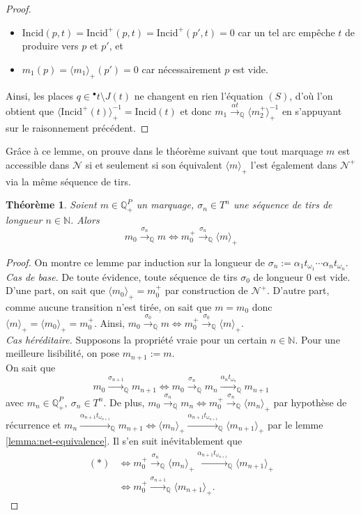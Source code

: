 \documentclass{article}
\newtheorem{theorem}{Théorème}
\theoremstyle{remark}
\theoremstyle{remark}
\newcommand{\preb}[1]{{}^\bullet #1}
\newcommand{\reaches}[1][]{\xrightarrow{#1}}
\newcommand{\creaches}[1][]{\reaches[#1]_{\mathbb{Q}}}
\newcommand{\induction}[3]{
    \textit{Cas de base.} #2\\
    \textit{Cas héréditaire.} Supposons la propriété vraie pour un certain $n \in #1$. #3
}
\newcommand{\extend}[1][\cdot]{\langle #1 \rangle}
\newcommand{\coextend}[1][\cdot]{\extend[#1]_+}
\newcommand{\rcoextend}[1][\cdot]{\coextend[#1]^{-1}}
\newcommand{\incid}{\mathrm{Incid}}
\begin{document}
\begin{proof}
\begin{itemize}
        \item $\incid(p, t) = \incid^+(p, t) = \incid^+(p', t) = 0$ car un tel arc empêche $t$ de produire vers $p$ et $p'$, et
        \item $m_1(p) = \coextend[m_1](p') = 0$ car nécessairement $p$ est vide.
    \end{itemize}
    
    Ainsi, les places $q \in \preb{t} \setminus J(t)$ ne changent en rien l'équation $(S)$, d'où l'on obtient que $\rcoextend[\incid^+(t)] = \incid(t)$ et donc $m_1 \creaches[\alpha t] \rcoextend[m_2^+]$ en s'appuyant sur le raisonnement précédent.
\end{proof}

Grâce à ce lemme, on prouve dans le théorème suivant que tout marquage $m$ est accessible dans $\mathcal{N}$ si et seulement si son équivalent $\coextend[m]$ l'est également dans $\mathcal{N}^+$ via la même séquence de tirs.

\begin{theorem}
    \label{theorem:inh-net-reset-net-equivalence}
    Soient $m \in \mathbb{Q}_+^P$ un marquage, $\sigma_n \in T^n$ une séquence de tirs de longueur $n \in \mathbb{N}$. Alors
    \[m_0 \creaches[\sigma_n] m \Longleftrightarrow m_0^+ \creaches[\sigma_n] \coextend[m]\]
\end{theorem}

\begin{proof}
    On montre ce lemme par induction sur la longueur de $\sigma_n := \alpha_1t_{\omega_1}\cdots\alpha_nt_{\omega_n}$.\\
    \induction{\mathbb{N}}{
        De toute évidence, toute séquence de tirs $\sigma_0$ de longueur $0$ est vide. D'une part, on sait que $\coextend[m_0] = m_0^+$ par construction de $\mathcal{N}^+$. D'autre part, comme aucune transition n'est tirée, on sait que $m = m_0$ donc $\coextend[m] = \coextend[m_0] = m_0^+$. Ainsi, $m_0 \creaches[\sigma_0] m \Longleftrightarrow m_0^+ \creaches[\sigma_0] \coextend[m]$.
    }{Pour une meilleure lisibilité, on pose $m_{n+1} := m$.\\
        On sait que \begin{equation}\tag{$*$}
            m_0 \creaches[\sigma_{n+1}] m_{n+1} \Longleftrightarrow m_0 \creaches[\sigma_n] m_n \creaches[\alpha_nt_{\omega_n}] m_{n+1}
        \end{equation}
        avec $m_n \in \mathbb{Q}_+^P,\ \sigma_n \in T^n$. De plus, $m_0 \creaches[\sigma_n] m_n \Longleftrightarrow m_0^+ \creaches[\sigma_n] \coextend[m_n]$ par hypothèse de récurrence et $m_n \creaches[\alpha_{n+1}t_{\omega_{n+1}}] m_{n+1} \Longleftrightarrow \coextend[m_n] \creaches[\alpha_{n+1}t_{\omega_{n+1}}] \coextend[m_{n+1}]$ par le lemme \ref{lemma:net-equivalence}.
        Il s'en suit inévitablement que \begin{align*}
            (*) & \Longleftrightarrow m_0^+ \creaches[\sigma_n] \coextend[m_n] \creaches[\alpha_{n+1}t_{\omega_{n+1}}] \coextend[m_{n+1}] \\
                & \Longleftrightarrow m_0^+ \creaches[\sigma_{n+1}] \coextend[m_{n+1}].
        \end{align*}
    }
\end{proof}
\end{document}
